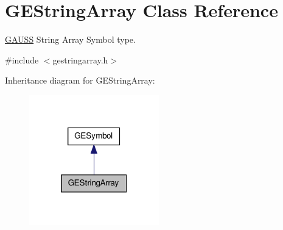 \hypertarget{class_g_e_string_array}{\section{G\-E\-String\-Array Class Reference}
\label{class_g_e_string_array}
}


\hyperlink{class_g_a_u_s_s}{G\-A\-U\-S\-S} String Array Symbol type.  




{\ttfamily \#include $<$gestringarray.\-h$>$}



Inheritance diagram for G\-E\-String\-Array\-:
\nopagebreak
\begin{figure}[H]
\begin{center}
\leavevmode
\includegraphics[width=160pt]{class_g_e_string_array__inherit__graph}
\end{center}
\end{figure}
